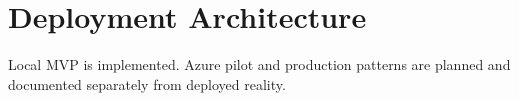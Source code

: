 \section{Deployment Architecture}
Local MVP is implemented. Azure pilot and production patterns are planned and documented separately from deployed reality.

